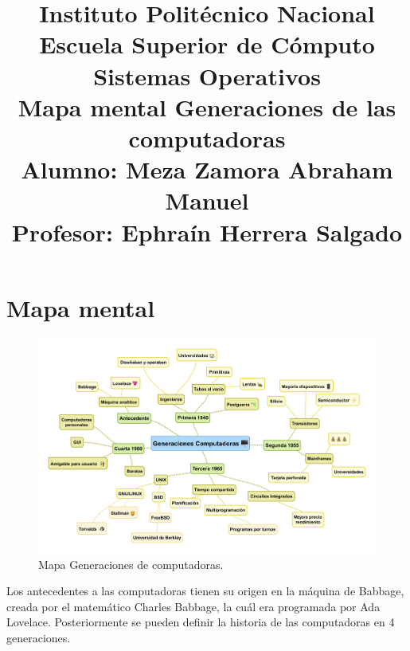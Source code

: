 \documentclass[a4paper,12pt]{article}
\begin{document}
\title{\Large Instituto Politécnico Nacional\\Escuela Superior de Cómputo\\Sistemas Operativos\\ Mapa mental Generaciones de las computadoras \\Alumno: Meza Zamora Abraham Manuel\\Profesor: Ephra\'in Herrera Salgado}
\date{}
\maketitle

\section{Mapa mental} 
\begin{figure}[h]
\center
\includegraphics[scale=.05]{uno}
\caption{Mapa Generaciones de computadoras.}
\end{figure}
\justify 
Los antecedentes a las computadoras tienen su origen en la máquina de Babbage, creada por el matemático Charles Babbage, la cuál era programada por Ada Lovelace. Posteriormente se pueden definir la historia de las computadoras en 4 generaciones.
\end{document}
